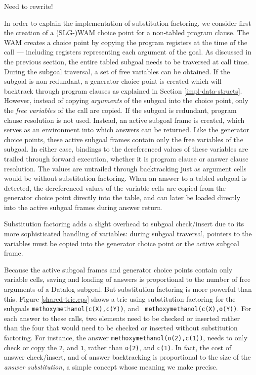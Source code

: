 Need to rewrite!

In order to explain the implementation of substitution factoring, we
consider first the creation of a (SLG-)WAM choice point for a
non-tabled program clause.  The WAM creates a choice point by copying
the program registers at the time of the call --- including registers
representing each argument of the goal.  As discussed in the previous
section, the entire tabled subgoal needs to be traversed at call time.
During the subgoal traversal, a set of free variables can be obtained.
If the subgoal is non-redundant, a generator choice point is created
which will backtrack through program clauses as explained in Section
\ref{impl-data-structs}.  However, instead of copying {\em arguments}
of the subgoal into the choice point, only the {\em free variables} of
the call are copied.  If the subgoal is redundant, program clause
resolution is not used.  Instead, an active subgoal frame is created,
which serves as an environment into which answers can be returned.
Like the generator choice points, these active subgoal frames contain
only the free variables of the subgoal.  In either case, bindings to
the dereferenced values of these variables are trailed through forward
execution, whether it is program clause or answer clause resolution.
The values are untrailed through backtracking just as argument cells
would be without substitution factoring.  When an answer to a tabled
subgoal is detected, the dereferenced values of the variable cells are
copied from the generator choice point directly into the table, and
can later be loaded directly into the active subgoal frames during
answer return.

Substitution factoring adds a slight overhead to subgoal check/insert
due to its more sophisticated handling of variables: during subgoal
traversal, pointers to the variables must be copied into the generator
choice point or the active subgoal frame.

Because the active subgoal frames and generator choice points contain
only variable cells, saving and loading of answers is proportional to
the number of free arguments of a Datalog subgoal.  But substitution
factoring is more powerful than this.  Figure
\ref{shared-trie.eps} shows a trie using substitution factoring for
the subgoals {\tt methoxymethanol(c(X),c(Y))}, and {\tt
methoxymethanol(c(X),o(Y))}.  For each answer to these calls, two
elements need to be checked or inserted rather than the four that
would need to be checked or inserted without substitution factoring.
For instance, the answer {\tt methoxymethanol(o(2),c(1))}, needs to
only check or copy the {\tt 2}, and {\tt 1}, rather than {\tt o(2)},
and {\tt c(1)}.  In fact, the cost of answer check/insert, and of
answer backtracking is proportional to the size of the {\em answer
substitution}, a simple concept whose meaning we make precise.

